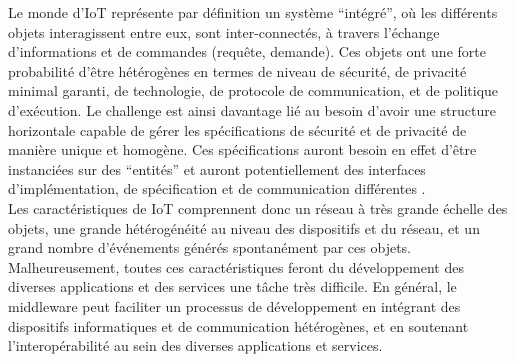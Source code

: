 Le monde d’IoT représente par définition un système “intégré”, où les différents objets interagissent entre eux, sont inter-connectés, à travers l’échange d’informations et de commandes (requête, demande). Ces objets ont une forte probabilité d’être hétérogènes en termes de niveau de sécurité, de privacité minimal garanti, de technologie, de protocole de communication, et de politique d’exécution. Le challenge est ainsi davantage lié au besoin d’avoir une structure horizontale capable de gérer les spécifications de sécurité et de privacité de manière unique et homogène. Ces spécifications auront besoin en effet d’être instanciées sur des “entités” et auront potentiellement des interfaces d’implémentation, de spécification et de communication différentes \cite{vermesan2014internet}.
\\

Les caractéristiques de IoT comprennent donc un réseau à très grande échelle des objets, une grande hétérogénéité au niveau des dispositifs et du réseau, et un grand nombre d'événements générés spontanément par ces objets. Malheureusement, toutes ces caractéristiques feront du développement des diverses applications et des services une tâche très difficile. En général, le middleware peut faciliter un processus de développement en intégrant des dispositifs informatiques et de communication hétérogènes, et en soutenant l'interopérabilité au sein des diverses applications et services.

